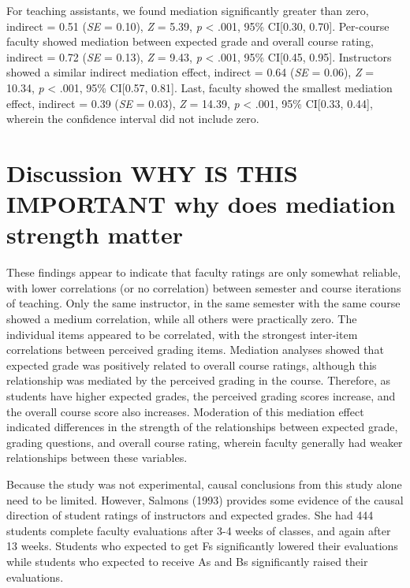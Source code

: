 \documentclass[,man]{apa6}
\theoremstyle{definition}
\theoremstyle{definition}
\theoremstyle{definition}
\theoremstyle{remark}
\begin{document}
For teaching assistants, we found mediation significantly greater than
zero, indirect = 0.51 (\emph{SE} = 0.10), \emph{Z} = 5.39, \emph{p}
\textless{} .001, 95\% CI{[}0.30, 0.70{]}. Per-course faculty showed
mediation between expected grade and overall course rating, indirect =
0.72 (\emph{SE} = 0.13), \emph{Z} = 9.43, \emph{p} \textless{} .001,
95\% CI{[}0.45, 0.95{]}. Instructors showed a similar indirect mediation
effect, indirect = 0.64 (\emph{SE} = 0.06), \emph{Z} = 10.34, \emph{p}
\textless{} .001, 95\% CI{[}0.57, 0.81{]}. Last, faculty showed the
smallest mediation effect, indirect = 0.39 (\emph{SE} = 0.03), \emph{Z}
= 14.39, \emph{p} \textless{} .001, 95\% CI{[}0.33, 0.44{]}, wherein the
confidence interval did not include zero.

\hypertarget{discussion-why-is-this-important-why-does-mediation-strength-matter}{%
\section{Discussion WHY IS THIS IMPORTANT why does mediation strength
matter}\label{discussion-why-is-this-important-why-does-mediation-strength-matter}}

These findings appear to indicate that faculty ratings are only somewhat
reliable, with lower correlations (or no correlation) between semester
and course iterations of teaching. Only the same instructor, in the same
semester with the same course showed a medium correlation, while all
others were practically zero. The individual items appeared to be
correlated, with the strongest inter-item correlations between perceived
grading items. Mediation analyses showed that expected grade was
positively related to overall course ratings, although this relationship
was mediated by the perceived grading in the course. Therefore, as
students have higher expected grades, the perceived grading scores
increase, and the overall course score also increases. Moderation of
this mediation effect indicated differences in the strength of the
relationships between expected grade, grading questions, and overall
course rating, wherein faculty generally had weaker relationships
between these variables.

Because the study was not experimental, causal conclusions from this
study alone need to be limited. However, Salmons (1993) provides some
evidence of the causal direction of student ratings of instructors and
expected grades. She had 444 students complete faculty evaluations after
3-4 weeks of classes, and again after 13 weeks. Students who expected to
get Fs significantly lowered their evaluations while students who
expected to receive As and Bs significantly raised their evaluations.
\end{document}
